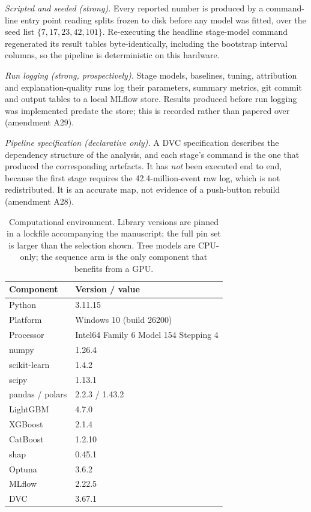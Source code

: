 \documentclass[a4paper]{article}
\begin{document}
\emph{Scripted and seeded (strong).} Every reported number is produced by a
command-line entry point reading splits frozen to disk before any model was
fitted, over the seed list $\{7,17,23,42,101\}$. Re-executing the headline
stage-model command regenerated its result tables byte-identically, including
the bootstrap interval columns, so the pipeline is deterministic on this
hardware.

\emph{Run logging (strong, prospectively).} Stage models, baselines, tuning,
attribution and explanation-quality runs log their parameters, summary metrics,
git commit and output tables to a local MLflow store. Results produced before
run logging was implemented predate the store; this is recorded rather than
papered over (amendment A29).

\emph{Pipeline specification (declarative only).} A DVC specification describes
the dependency structure of the analysis, and each stage's command is the one
that produced the corresponding artefacts. It has \emph{not} been executed end
to end, because the first stage requires the 42.4-million-event raw log, which
is not redistributed. It is an accurate map, not evidence of a push-button
rebuild (amendment A28).

\begin{table}[htbp]
\centering
\caption{Computational environment. Library versions are pinned in a lockfile
accompanying the manuscript; the full pin set is larger than the selection
shown. Tree models are CPU-only; the sequence arm is the only component that
benefits from a GPU.}
\label{tab:environment}
\small
\begin{tabular}{@{}ll@{}}
\toprule
\textbf{Component} & \textbf{Version / value} \\
\midrule
Python & 3.11.15 \\
Platform & Windows 10 (build 26200) \\
Processor & Intel64 Family 6 Model 154 Stepping 4 \\
numpy & 1.26.4 \\
scikit-learn & 1.4.2 \\
scipy & 1.13.1 \\
pandas / polars & 2.2.3 / 1.43.2 \\
LightGBM & 4.7.0 \\
XGBoost & 2.1.4 \\
CatBoost & 1.2.10 \\
shap & 0.45.1 \\
Optuna & 3.6.2 \\
MLflow & 2.22.5 \\
DVC & 3.67.1 \\
\bottomrule
\end{tabular}
\end{table}
\end{document}
